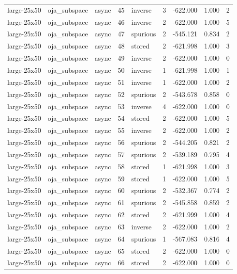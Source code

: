 \begin{tabular}{lllrlrrrr}
large-25x50 & oja\_subspace & async & 45 & inverse & 3 & -622.000 & 1.000 & 2 \\
large-25x50 & oja\_subspace & async & 46 & inverse & 2 & -622.000 & 1.000 & 5 \\
large-25x50 & oja\_subspace & async & 47 & spurious & 2 & -545.121 & 0.834 & 2 \\
large-25x50 & oja\_subspace & async & 48 & stored & 2 & -621.998 & 1.000 & 3 \\
large-25x50 & oja\_subspace & async & 49 & inverse & 2 & -622.000 & 1.000 & 0 \\
large-25x50 & oja\_subspace & async & 50 & inverse & 1 & -621.998 & 1.000 & 1 \\
large-25x50 & oja\_subspace & async & 51 & inverse & 1 & -622.000 & 1.000 & 2 \\
large-25x50 & oja\_subspace & async & 52 & spurious & 2 & -543.678 & 0.858 & 0 \\
large-25x50 & oja\_subspace & async & 53 & inverse & 4 & -622.000 & 1.000 & 0 \\
large-25x50 & oja\_subspace & async & 54 & stored & 2 & -622.000 & 1.000 & 5 \\
large-25x50 & oja\_subspace & async & 55 & inverse & 2 & -622.000 & 1.000 & 2 \\
large-25x50 & oja\_subspace & async & 56 & spurious & 2 & -544.205 & 0.821 & 2 \\
large-25x50 & oja\_subspace & async & 57 & spurious & 2 & -539.189 & 0.795 & 4 \\
large-25x50 & oja\_subspace & async & 58 & stored & 1 & -621.998 & 1.000 & 3 \\
large-25x50 & oja\_subspace & async & 59 & stored & 1 & -622.000 & 1.000 & 5 \\
large-25x50 & oja\_subspace & async & 60 & spurious & 2 & -532.367 & 0.774 & 2 \\
large-25x50 & oja\_subspace & async & 61 & spurious & 2 & -545.858 & 0.859 & 2 \\
large-25x50 & oja\_subspace & async & 62 & stored & 2 & -621.999 & 1.000 & 4 \\
large-25x50 & oja\_subspace & async & 63 & inverse & 2 & -622.000 & 1.000 & 2 \\
large-25x50 & oja\_subspace & async & 64 & spurious & 1 & -567.083 & 0.816 & 4 \\
large-25x50 & oja\_subspace & async & 65 & stored & 2 & -622.000 & 1.000 & 0 \\
large-25x50 & oja\_subspace & async & 66 & stored & 2 & -622.000 & 1.000 & 0 \\

\end{tabular}
